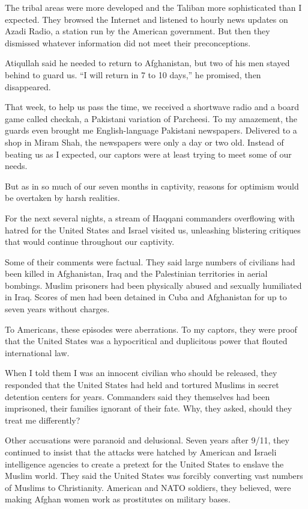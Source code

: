 ﻿\documentclass[12pt]{article}
\begin{document}
The tribal areas were more developed and the Taliban more sophisticated than I expected. They
browsed the Internet and listened to hourly news updates on Azadi Radio, a station run by the
American government. But then they dismissed whatever information did not meet their preconceptions.

Atiqullah said he needed to return to Afghanistan, but two of his men stayed behind to guard us. ``I
will return in 7 to 10 days,'' he promised, then disappeared.

That week, to help us pass the time, we received a shortwave radio and a board game called checkah,
a Pakistani variation of Parcheesi. To my amazement, the guards even brought me English-language
Pakistani newspapers. Delivered to a shop in Miram Shah, the newspapers were only a day or two old.
Instead of beating us as I expected, our captors were at least trying to meet some of our needs.

But as in so much of our seven months in captivity, reasons for optimism would be overtaken by harsh
realities.

For the next several nights, a stream of Haqqani commanders overflowing with hatred for the United
States and Israel visited us, unleashing blistering critiques that would continue throughout our
captivity.

Some of their comments were factual. They said large numbers of civilians had been killed in
Afghanistan, Iraq and the Palestinian territories in aerial bombings. Muslim prisoners had been
physically abused and sexually humiliated in Iraq. Scores of men had been detained in Cuba and
Afghanistan for up to seven years without charges.

To Americans, these episodes were aberrations. To my captors, they were proof that the United States
was a hypocritical and duplicitous power that flouted international law.

When I told them I was an innocent civilian who should be released, they responded that the United
States had held and tortured Muslims in secret detention centers for years. Commanders said they
themselves had been imprisoned, their families ignorant of their fate. Why, they asked, should they
treat me differently?

Other accusations were paranoid and delusional. Seven years after 9/11, they continued to insist
that the attacks were hatched by American and Israeli intelligence agencies to create a pretext for
the United States to enslave the Muslim world. They said the United States was forcibly converting
vast numbers of Muslims to Christianity. American and NATO soldiers, they believed, were making
Afghan women work as prostitutes on military bases.
\end{document}
